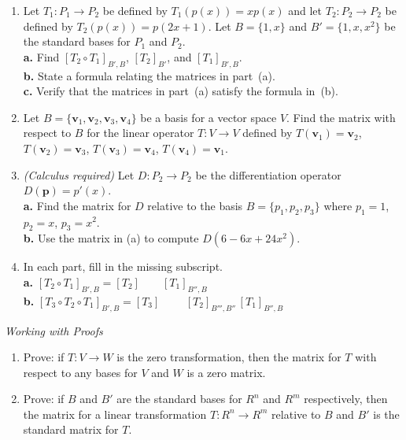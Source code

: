\documentclass{article}
\begin{document}
\begin{enumerate}
  \item[12.] Let $T_1 : P_1 \to P_2$ be defined by $T_1(p(x)) = xp(x)$ and let
        $T_2 : P_2 \to P_2$ be defined by $T_2(p(x)) = p(2x+1)$.
        Let $B = \{1,x\}$ and $B' = \{1,x,x^2\}$ be the standard bases for $P_1$ and $P_2$.\\
        \textbf{a.} Find $[T_2\circ T_1]_{B',B}$, $[T_2]_{B'}$, and $[T_1]_{B',B}$.\\
        \textbf{b.} State a formula relating the matrices in part~(a).\\
        \textbf{c.} Verify that the matrices in part~(a) satisfy the formula in~(b).

  \item[14.] Let $B = \{\mathbf{v}_1,\mathbf{v}_2,\mathbf{v}_3,\mathbf{v}_4\}$ be a basis
        for a vector space $V$. Find the matrix with respect to $B$ for the linear operator
        $T : V \to V$ defined by
        $T(\mathbf{v}_1) = \mathbf{v}_2$, $T(\mathbf{v}_2) = \mathbf{v}_3$,
        $T(\mathbf{v}_3) = \mathbf{v}_4$, $T(\mathbf{v}_4) = \mathbf{v}_1$.

  \item[17.] \textit{(Calculus required)} Let $D : P_2 \to P_2$ be the differentiation
        operator $D(\mathbf{p}) = p'(x)$.\\
        \textbf{a.} Find the matrix for $D$ relative to the basis
        $B = \{p_1, p_2, p_3\}$ where $p_1=1$, $p_2=x$, $p_3=x^2$.\\
        \textbf{b.} Use the matrix in (a) to compute $D(6-6x+24x^2)$.

  \item[21.] In each part, fill in the missing subscript.\\
        \textbf{a.} $[T_2\circ T_1]_{B',B} = [T_2]_{\phantom{B',B''}} [T_1]_{B'',B}$\\
        \textbf{b.} $[T_3\circ T_2\circ T_1]_{B',B} = [T_3]_{\phantom{B',B'''}}\,
        [T_2]_{B''',B''}\,[T_1]_{B'',B}$

\end{enumerate}

\noindent\textit{Working with Proofs}

\begin{enumerate}
  \item[22.] Prove: if $T : V \to W$ is the zero transformation, then the matrix for $T$
        with respect to any bases for $V$ and $W$ is a zero matrix.

  \item[23.] Prove: if $B$ and $B'$ are the standard bases for $R^n$ and $R^m$
        respectively, then the matrix for a linear transformation $T : R^n \to R^m$
        relative to $B$ and $B'$ is the standard matrix for $T$.

\end{enumerate}
\end{document}
